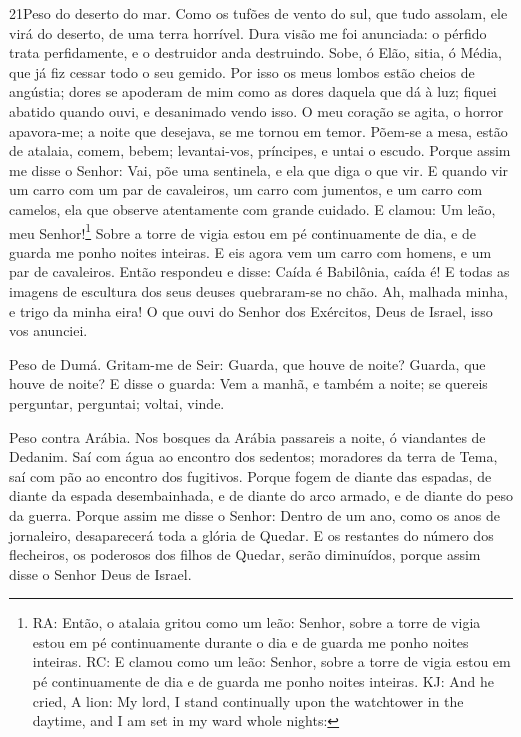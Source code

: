 \lettrine{21}{}Peso do deserto do mar. Como os tufões de vento
do sul, que tudo assolam, ele virá do deserto, de uma terra
horrível. Dura visão me foi anunciada: o pérfido trata
perfidamente, e o destruidor anda destruindo. Sobe, ó Elão, sitia, ó
Média, que já fiz cessar todo o seu gemido. Por isso os meus
lombos estão cheios de angústia; dores se apoderam de mim como as
dores daquela que dá à luz; fiquei abatido quando ouvi, e desanimado
vendo isso. O meu coração se agita, o horror apavora-me; a noite
que desejava, se me tornou em temor. Põem-se a mesa, estão de
atalaia, comem, bebem; levantai-vos, príncipes, e untai o escudo.
Porque assim me disse o Senhor: Vai, põe uma sentinela, e ela
que diga o que vir. E quando vir um carro com um par de
cavaleiros, um carro com jumentos, e um carro com camelos, ela que
observe atentamente com grande cuidado. E clamou: Um leão, meu
Senhor!\footnote{RA: Então, o atalaia gritou como um leão: Senhor,
sobre a torre de vigia estou em pé continuamente durante o dia e de
guarda me ponho noites inteiras. RC: E clamou como um leão: Senhor,
sobre a torre de vigia estou em pé continuamente de dia e de guarda
me ponho noites inteiras. KJ: And he cried, A lion: My lord, I stand
continually upon the watchtower in the daytime, and I am set in my
ward whole nights:} Sobre a torre de vigia estou em pé continuamente
de dia, e de guarda me ponho noites inteiras. E eis agora vem um
carro com homens, e um par de cavaleiros. Então respondeu e disse:
Caída é Babilônia, caída é! E todas as imagens de escultura dos seus
deuses quebraram-se no chão. Ah, malhada minha, e trigo da
minha eira! O que ouvi do Senhor dos Exércitos, Deus de Israel, isso
vos anunciei.

Peso de Dumá. Gritam-me de Seir: Guarda, que houve de noite?
Guarda, que houve de noite? E disse o guarda: Vem a manhã, e
também a noite; se quereis perguntar, perguntai; voltai, vinde.

Peso contra Arábia. Nos bosques da Arábia passareis a noite, ó
viandantes de Dedanim. Saí com água ao encontro dos sedentos;
moradores da terra de Tema, saí com pão ao encontro dos fugitivos.
Porque fogem de diante das espadas, de diante da espada
desembainhada, e de diante do arco armado, e de diante do peso da
guerra. Porque assim me disse o Senhor: Dentro de um ano,
como os anos de jornaleiro, desaparecerá toda a glória de Quedar.
E os restantes do número dos flecheiros, os poderosos dos
filhos de Quedar, serão diminuídos, porque assim disse o Senhor Deus
de Israel.

\medskip


